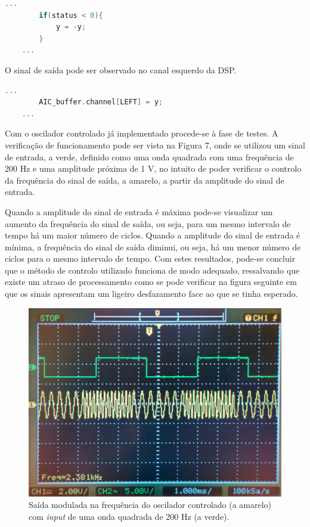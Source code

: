 \documentclass[11pt]{article}
\numberwithin{equation}{section}
\begin{document}
\begin{lstlisting}[language=C]
	...
		if(status < 0){
			y = -y;
		}
	...
\end{lstlisting}

O sinal de saída pode ser observado no canal esquerdo da DSP.

\begin{lstlisting}[language=C]
	...
		AIC_buffer.channel[LEFT] = y;
	...
\end{lstlisting}

Com o oscilador controlado já implementado procede-se à fase de testes. A verificação de funcionamento pode ser vista na Figura 7, onde se utilizou um sinal de entrada, a verde, definido como uma onda quadrada com uma frequência de 200 Hz e uma amplitude próxima de 1 V, no intuito de poder verificar o controlo da frequência do sinal de saída, a amarelo, a partir da amplitude do sinal de entrada. 

Quando a amplitude do sinal de entrada é máxima pode-se visualizar um aumento da frequência do sinal de saída, ou seja, para um mesmo intervalo de tempo há um maior número de ciclos. Quando a amplitude do sinal de entrada é mínima, a frequência do sinal de saída diminui, ou seja, há um menor número de ciclos para o mesmo intervalo de tempo. Com estes resultados, pode-se concluir que o método de controlo utilizado funciona de modo adequado, ressalvando que existe um atraso de processamento como se pode verificar na figura seguinte em que os sinais apresentam um ligeiro desfazamento face ao que se tinha esperado.


\begin{figure}[H]
	\centering
	\includegraphics[keepaspectratio=true, scale=0.10]{exps/200Hz_2_6}
	\caption{Saída modulada na frequência do oscilador controlado (a amarelo) com \textit{input} de uma onda quadrada de 200 Hz (a verde).}
	\vspace{-0.8em}
\end{figure}
\end{document}
